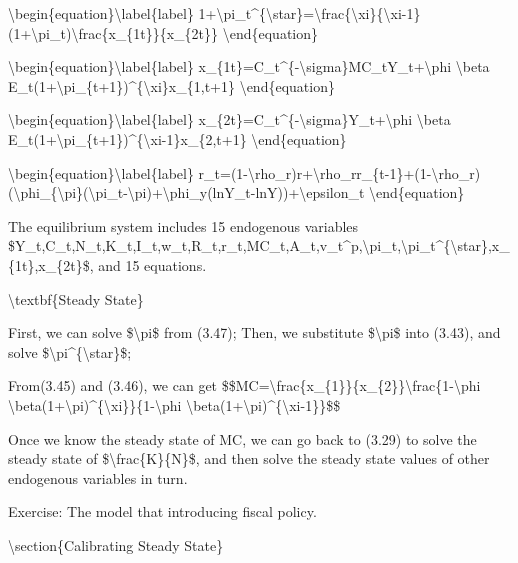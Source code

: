 \documentclass[10pt,math=newtx,citestyle=gb7714-2015,bibstyle=gb7714-2015]{elegantbook}
\begin{document}
	\textbackslash{}begin\{equation\}\textbackslash{}label\{label\}
	1+\textbackslash{}pi\_t\^{}\{\textbackslash{}star\}=\textbackslash{}frac\{\textbackslash{}xi\}\{\textbackslash{}xi-1\}(1+\textbackslash{}pi\_t)\textbackslash{}frac\{x\_\{1t\}\}\{x\_\{2t\}\}
	\textbackslash{}end\{equation\}
	
	\textbackslash{}begin\{equation\}\textbackslash{}label\{label\}
	x\_\{1t\}=C\_t\^{}\{-\textbackslash{}sigma\}MC\_tY\_t+\textbackslash{}phi \textbackslash{}beta E\_t(1+\textbackslash{}pi\_\{t+1\})\^{}\{\textbackslash{}xi\}x\_\{1,t+1\}
	\textbackslash{}end\{equation\}
	
	\textbackslash{}begin\{equation\}\textbackslash{}label\{label\}
	x\_\{2t\}=C\_t\^{}\{-\textbackslash{}sigma\}Y\_t+\textbackslash{}phi \textbackslash{}beta E\_t(1+\textbackslash{}pi\_\{t+1\})\^{}\{\textbackslash{}xi-1\}x\_\{2,t+1\}
	\textbackslash{}end\{equation\}
	
	\textbackslash{}begin\{equation\}\textbackslash{}label\{label\}
	r\_t=(1-\textbackslash{}rho\_r)r+\textbackslash{}rho\_rr\_\{t-1\}+(1-\textbackslash{}rho\_r)(\textbackslash{}phi\_\{\textbackslash{}pi\}(\textbackslash{}pi\_t-\textbackslash{}pi)+\textbackslash{}phi\_y(lnY\_t-lnY))+\textbackslash{}epsilon\_t
	\textbackslash{}end\{equation\}
	
	The equilibrium system includes 15 endogenous variables \$Y\_t,C\_t,N\_t,K\_t,I\_t,w\_t,R\_t,r\_t,MC\_t,A\_t,v\_t\^{}p,\textbackslash{}pi\_t,\textbackslash{}pi\_t\^{}\{\textbackslash{}star\},x\_\{1t\},x\_\{2t\}\$, and 15 equations.
	
	
	\textbackslash{}textbf\{Steady State\}
	
	First, we can solve \$\textbackslash{}pi\$ from (3.47);
	Then, we substitute \$\textbackslash{}pi\$ into (3.43), and solve \$\textbackslash{}pi\^{}\{\textbackslash{}star\}\$;
	
	From(3.45) and (3.46), we can get
	\$\$MC=\textbackslash{}frac\{x\_\{1\}\}\{x\_\{2\}\}\textbackslash{}frac\{1-\textbackslash{}phi \textbackslash{}beta(1+\textbackslash{}pi)\^{}\{\textbackslash{}xi\}\}\{1-\textbackslash{}phi \textbackslash{}beta(1+\textbackslash{}pi)\^{}\{\textbackslash{}xi-1\}\}\$\$
	
	Once we know the steady state of MC, we can go back to (3.29) to solve the steady state of \$\textbackslash{}frac\{K\}\{N\}\$, and then solve the steady state values of other endogenous variables in turn.
	
	Exercise: The model that introducing fiscal policy.
	
	
	\textbackslash{}section\{Calibrating Steady State\}
	
\end{document}
